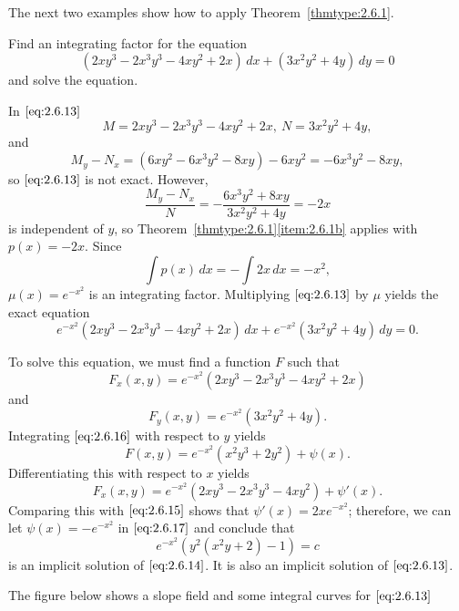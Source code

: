 \documentclass{ximera}
\begin{document}
The next two examples show how to apply
Theorem~\ref{thmtype:2.6.1}.

\begin{example}\label{example:2.6.1}
Find an integrating factor for the equation
\begin{equation}\label{eq:2.6.13}
(2xy^3-2x^3y^3-4xy^2+2x)\,dx+(3x^2y^2+4y)\,dy=0
\end{equation}
and solve the equation.
\begin{explanation}
In $\eqref{eq:2.6.13}$
$$
M=2xy^3-2x^3y^3-4xy^2+2x,\ N=3x^2y^2+4y,
$$
and
$$
M_y-N_x=(6xy^2-6x^3y^2-8xy)-6xy^2=-6x^3y^2-8xy,
$$
so $\eqref{eq:2.6.13}$ is not  exact. However,
$$
\frac{M_y-N_x}{N}=-\frac{6x^3y^2+8xy}{3x^2y^2+4y}=-2x
$$
is independent of $y$, so Theorem~\ref{thmtype:2.6.1}\ref{item:2.6.1b} applies
with $p(x)=-2x$. Since
$$
\int p (x)\,dx=-\int 2x\,dx=-x^2,
$$
 $\mu(x)=e^{-x^2}$ is an
integrating factor.  Multiplying $\eqref{eq:2.6.13}$ by $\mu$ yields the
exact equation
\begin{equation}\label{eq:2.6.14}
e^{-x^2}(2xy^3-2x^3y^3-4xy^2+2x)\,dx+
 e^{-x^2}(3x^2y^2+4y)\,dy=0.
\end{equation}

To solve this equation, we must find a
function $F$ such that
\begin{equation}\label{eq:2.6.15}
F_x(x,y)=e^{-x^2}(2xy^3-2x^3y^3-4xy^2+2x)
\end{equation}
 and
\begin{equation}\label{eq:2.6.16}
F_y(x,y)=e^{-x^2}(3x^2y^2+4y).
\end{equation}
 Integrating $\eqref{eq:2.6.16}$ with respect to $y$ yields
\begin{equation}\label{eq:2.6.17}
F(x,y)=e^{-x^2}(x^2y^3+2y^2)+\psi(x).
\end{equation}
 Differentiating this with respect to $x$ yields
$$
F_x(x,y)=e^{-x^2}(2xy^3-2x^3y^3-4xy^2)+\psi'(x).
$$
Comparing this with $\eqref{eq:2.6.15}$ shows that $\psi'(x)=
2xe^{-x^2}$;  therefore, we can let $\psi(x)=-e^{-x^2}$ in
$\eqref{eq:2.6.17}$ and conclude that
$$
e^{-x^2}\left(y^2(x^2y+2)-1\right)=c
$$
is an implicit solution of $\eqref{eq:2.6.14}$. It is also an implicit solution
of $\eqref{eq:2.6.13}$.

The figure below  shows a  slope field and some integral curves
for $\eqref{eq:2.6.13}$

\begin{center}
\end{center}


\end{explanation}
\end{example}
\end{document}
